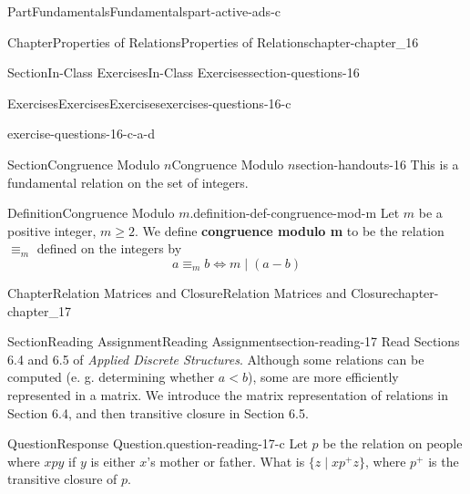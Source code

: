 \documentclass[oneside,10pt,]{book}
\newcommand{\terminology}[1]{\textbf{#1}}
\numberwithin{equation}{section}
\newcommand{\lt}{<}
\begin{document}
\begin{partptx}{Part}{Fundamentals}{}{Fundamentals}{}{}{part-active-ads-c}
\begin{chapterptx}{Chapter}{Properties of Relations}{}{Properties of Relations}{}{}{chapter-chapter_16}
\begin{sectionptx}{Section}{In-Class Exercises}{}{In-Class Exercises}{}{}{section-questions-16}
\begin{exercises-subsection-numberless}{Exercises}{Exercises}{}{Exercises}{}{}{exercises-questions-16-c}
\begin{exercisegroup}
\begin{divisionexerciseeg}{4}{}{}{exercise-questions-16-c-a-d}
\end{divisionexerciseeg}%
\end{exercisegroup}
\par\medskip\noindent
\end{exercises-subsection-numberless}
\end{sectionptx}
%
%
\typeout{************************************************}
\typeout{************************************************}
%
\begin{sectionptx}{Section}{Congruence Modulo \(n\)}{}{Congruence Modulo \(n\)}{}{}{section-handouts-16}
This is a fundamental relation on the set of integers.%
\begin{definition}{Definition}{Congruence Modulo \(m\).}{definition-def-congruence-mod-m}%
%
\label{notation-def-congruence-mod-m-c}%
\label{notation-def-congruence-mod-m-d}%
Let \(m\) be a positive integer, \(m\geq 2\).  We define \terminology{congruence modulo m} to be the relation \(\equiv_m\) defined on the integers by%
\begin{equation*}
a \equiv_m b \Leftrightarrow m \mid (a-b)
\end{equation*}
%
\end{definition}
\end{sectionptx}
\end{chapterptx}
%
\typeout{************************************************}
\typeout{************************************************}
%
\begin{chapterptx}{Chapter}{Relation Matrices and Closure}{}{Relation Matrices and Closure}{}{}{chapter-chapter_17}
\renewcommand*{\chaptername}{Chapter}
\index{}%
%
%
\typeout{************************************************}
\typeout{************************************************}
%
\begin{sectionptx}{Section}{Reading Assignment}{}{Reading Assignment}{}{}{section-reading-17}
Read Sections 6.4 and 6.5 of \emph{Applied Discrete Structures}.  Although some relations can be computed (e. g. determining whether \(a \lt b\)), some are more efficiently represented in a matrix.  We introduce the matrix representation of relations in Section 6.4, and then transitive closure in Section 6.5.%
\begin{question}{Question}{Response Question.}{question-reading-17-c}%
Let \(p\) be the relation on people where \(x p y\) if \(y\) is either \(x\)'s mother or father.   What is \(\{z \mid x p^+ z\}\), where \(p^+\) is the transitive closure of \(p\).%

\end{question}
\end{sectionptx}
\end{chapterptx}
\end{partptx}
\end{document}
